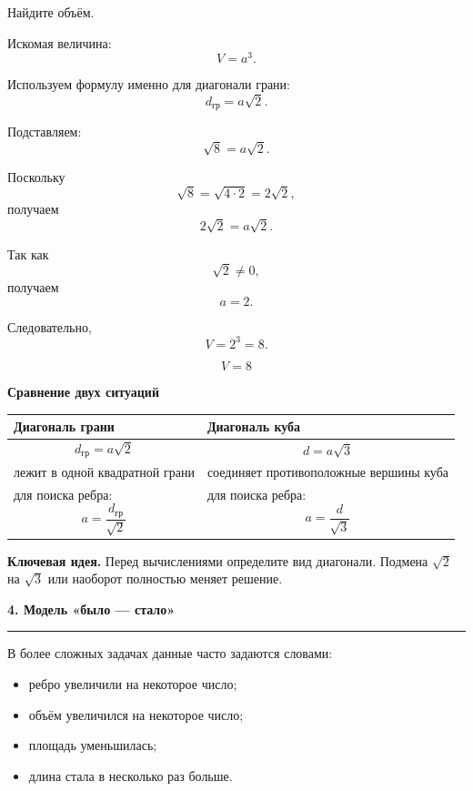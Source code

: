 \documentclass[a4paper,12pt]{article}
\newcommand{\sectiontitle}[1]{%
    \vspace{0.6em}
    {\Large\bfseries\color{darkaccent}#1}\par
    \vspace{0.25em}
    {\color{accent}\rule{\linewidth}{0.7pt}}
    \vspace{0.45em}
}
\newcommand{\subsectiontitle}[1]{%
    \vspace{0.4em}
    {\large\bfseries\color{darkaccent}#1}\par
    \vspace{0.2em}
}
\newcommand{\keyidea}[1]{%
    \par\medskip
    {\bfseries\color{darkaccent}Ключевая идея.} #1
    \par\medskip
}
\begin{document}
Найдите объём.

Искомая величина:
\[
V=a^3.
\]

Используем формулу именно для диагонали грани:
\[
d_{\text{гр}}=a\sqrt2.
\]

Подставляем:
\[
\sqrt8=a\sqrt2.
\]

Поскольку
\[
\sqrt8
=
\sqrt{4\cdot2}
=
2\sqrt2,
\]
получаем
\[
2\sqrt2=a\sqrt2.
\]

Так как
\[
\sqrt2\ne0,
\]
получаем
\[
a=2.
\]

Следовательно,
\[
V=2^3=8.
\]

\[
\boxed{V=8}
\]

\subsectiontitle{Сравнение двух ситуаций}

\begin{center}

\renewcommand{\arraystretch}{1.45}

\begin{tabularx}{\linewidth}{@{}X X@{}}
\toprule

\textbf{Диагональ грани}
&
\textbf{Диагональ куба}
\\

\midrule

\[
d_{\text{гр}}=a\sqrt2
\]
&
\[
d=a\sqrt3
\]
\\

лежит в одной квадратной грани
&
соединяет противоположные вершины куба
\\

для поиска ребра:
\[
a=\frac{d_{\text{гр}}}{\sqrt2}
\]
&
для поиска ребра:
\[
a=\frac{d}{\sqrt3}
\]
\\

\bottomrule
\end{tabularx}

\end{center}

\keyidea{
Перед вычислениями определите вид диагонали.
Подмена \(\sqrt2\) на \(\sqrt3\) или наоборот полностью меняет решение.
}

\sectiontitle{4. Модель «было --- стало»}

В более сложных задачах данные часто задаются словами:

\begin{itemize}
    \item ребро увеличили на некоторое число;
    \item объём увеличился на некоторое число;
    \item площадь уменьшилась;
    \item длина стала в несколько раз больше.
\end{itemize}
\end{document}
